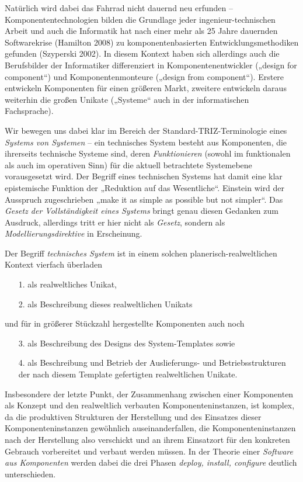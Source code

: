 \documentclass[11pt,a4paper]{article}
\begin{document}
Natürlich wird dabei das Fahrrad nicht dauernd neu erfunden --
Komponententechnologien bilden die Grundlage jeder ingenieur-technischen
Arbeit und auch die Informatik hat nach einer mehr als 25 Jahre dauernden
Softwarekrise (Hamilton 2008) zu komponentenbasierten Entwicklungsmethodiken
gefunden (Szyperski 2002).  In diesem Kontext haben sich allerdings auch die
Berufsbilder der Informatiker differenziert in Komponentenentwickler („design
for component“) und Komponentenmonteure („design from component“).  Erstere
entwickeln Komponenten für einen größeren Markt, zweitere entwickeln daraus
weiterhin die großen Unikate („Systeme“ auch in der informatischen
Fachsprache).

Wir bewegen uns dabei klar im Bereich der Standard-TRIZ-Terminologie eines
\emph{Systems von Systemen} -- ein technisches System besteht aus Komponenten,
die ihrerseits technische Systeme sind, deren \emph{Funktionieren} (sowohl im
funktionalen als auch im operativen Sinn) für die aktuell betrachtete
Systemebene vorausgesetzt wird. Der Begriff eines technischen Systems hat
damit eine klar epistemische Funktion der „Reduktion auf das Wesentliche“.
Einstein wird der Ausspruch zugeschrieben „make it as simple as possible but
not simpler“. Das \emph{Gesetz der Vollständigkeit eines Systems} bringt genau
diesen Gedanken zum Ausdruck, allerdings tritt er hier nicht als
\emph{Gesetz}, sondern als \emph{Modellierungsdirektive} in Erscheinung.

Der Begriff \emph{technisches System} ist in einem solchen
planerisch-realweltlichen Kontext vierfach überladen
\begin{itemize}
\item [1.] als realweltliches Unikat,
\item [2.] als Beschreibung dieses realweltlichen Unikats
\end{itemize}
und für in größerer Stückzahl hergestellte Komponenten auch noch
\begin{itemize}
\item [3.] als Beschreibung des Designs des System-Templates sowie
\item [4.] als Beschreibung und Betrieb der Auslieferungs- und
  Betriebsstrukturen der nach diesem Template gefertigten realweltlichen
  Unikate.
\end{itemize}

Insbesondere der letzte Punkt, der Zusammenhang zwischen einer Komponenten als
Konzept und den realweltlich verbauten Komponenteninstanzen, ist komplex, da
die produktiven Strukturen der Herstellung und des Einsatzes dieser
Komponenteninstanzen gewöhnlich auseinanderfallen, die Komponenteninstanzen
nach der Herstellung also verschickt und an ihrem Einsatzort für den konkreten
Gebrauch vorbereitet und verbaut werden müssen. In der Theorie einer
\emph{Software aus Komponenten} werden dabei die drei Phasen \emph{deploy,
  install, configure} deutlich unterschieden. 
\end{document}
